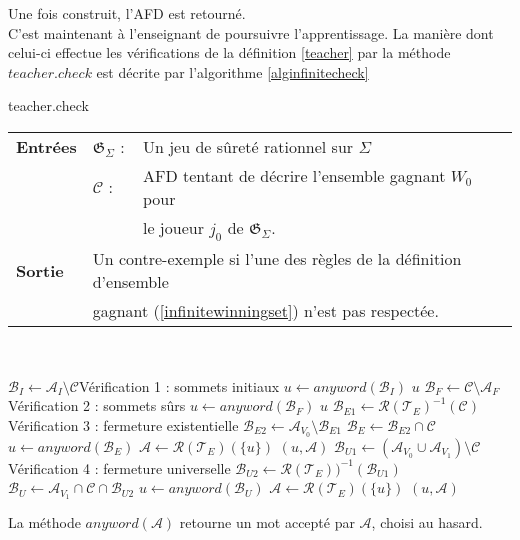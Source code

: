 \documentclass[12pt,a4paper,oneside,titlepage]{report}
\begin{document}
\noindent Une fois construit, l'AFD est retourné.\\

\noindent C'est maintenant à l'enseignant de poursuivre l'apprentissage.
La manière dont celui-ci effectue les vérifications de la définition \ref{teacher} par la méthode $teacher.check$ est décrite par l'algorithme \ref{alginfinitecheck}
\begin{algorithm}[H]
\caption{teacher.check}\label{alginfinitecheck}
\hspace*{\algorithmicindent} 
\begin{tabular}{lll}
	\textbf{Entrées} & \textbf{$\mathfrak{G}_\Sigma$} : &Un jeu de sûreté rationnel sur $\Sigma$\\
	&\textbf{$\mathcal{C}$} : &AFD tentant de décrire l'ensemble gagnant $W_0$ pour\\
	&&le joueur $j_0$ de $\mathfrak{G}_\Sigma$.\\
	\textbf{Sortie} &\multicolumn{2}{l}{Un contre-exemple si l'une des règles de la définition d'ensemble}\\
	&\multicolumn{2}{l}{gagnant (\ref{infinitewinningset}) n'est pas respectée.}
\end{tabular}\\
\begin{algorithmic}[1]
\State $\mathcal{B}_I\gets\mathcal{A}_I\setminus\mathcal{C}$\Comment Vérification 1 : sommets initiaux 
	\State $u\gets anyword(\mathcal{B}_I)$
	\State\Return $u$
\EndIf
\State $\mathcal{B}_F\gets\mathcal{C}\setminus\mathcal{A}_F$\Comment Vérification 2 : sommets sûrs
	\State $u\gets anyword(\mathcal{B}_F)$
	\State\Return $u$
\EndIf
\State $\mathcal{B}_{E1}\gets\mathcal{R}(\mathcal{T}_E)^{-1}(\mathcal{C})$\Comment Vérification 3 : fermeture existentielle
\State $\mathcal{B}_{E2}\gets\mathcal{A}_{V_0}\setminus\mathcal{B}_{E1}$
\State $\mathcal{B}_E\gets\mathcal{B}_{E2}\cap\mathcal{C}$
	\State $u\gets anyword(\mathcal{B}_E)$
	\State $\mathcal{A}\gets\mathcal{R}(\mathcal{T}_E)(\{u\})$
	\State\Return $(u,\mathcal{A})$ 
\EndIf
\State $\mathcal{B}_{U1}\gets(\mathcal{A}_{V_0}\cup\mathcal{A}_{V_1})\setminus\mathcal{C}$\Comment Vérification 4 : fermeture universelle
\State $\mathcal{B}_{U2}\gets\mathcal{R}(\mathcal{T}_E))^{-1}(\mathcal{B}_{U1})$
\State $\mathcal{B}_U\gets\mathcal{A}_{V_1}\cap\mathcal{C}\cap\mathcal{B}_{U2}$
	\State $u\gets anyword(\mathcal{B}_U)$
	\State $\mathcal{A}\gets\mathcal{R}(\mathcal{T}_E)(\{u\})$
	\State\Return $(u,\mathcal{A})$ 
\EndIf
\end{algorithmic}
\end{algorithm}
\noindent La méthode $anyword(\mathcal{A})$ retourne un mot accepté par $\mathcal{A}$, choisi au hasard.\\
\end{document}

